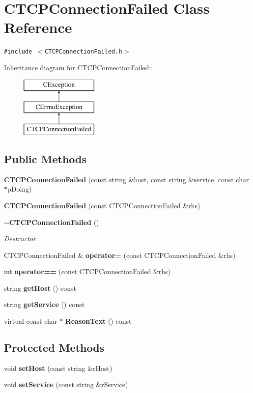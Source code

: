 \section{CTCPConnection\-Failed  Class Reference}
\label{classCTCPConnectionFailed}
{\tt \#include $<$CTCPConnection\-Failed.h$>$}

Inheritance diagram for CTCPConnection\-Failed::\begin{figure}[H]
\begin{center}
\leavevmode
\includegraphics[height=3cm]{classCTCPConnectionFailed}
\end{center}
\end{figure}
\subsection*{Public Methods}
\begin{CompactItemize}
\item 
{\bf CTCPConnection\-Failed} (const string \&host, const string \&service, const char $\ast$p\-Doing)
\item 
{\bf CTCPConnection\-Failed} (const CTCPConnection\-Failed \&rhs)
\item 
{\bf $\sim$CTCPConnection\-Failed} ()
\begin{CompactList}\small\item\em Destructor.\item\end{CompactList}\item 
CTCPConnection\-Failed \& {\bf operator=} (const CTCPConnection\-Failed \&rhs)
\item 
int {\bf operator==} (const CTCPConnection\-Failed \&rhs)
\item 
string {\bf get\-Host} () const
\item 
string {\bf get\-Service} () const
\item 
virtual const char $\ast$ {\bf Reason\-Text} () const
\end{CompactItemize}
\subsection*{Protected Methods}
\begin{CompactItemize}
\item 
void {\bf set\-Host} (const string \&r\-Host)
\item 
void {\bf set\-Service} (const string \&r\-Service)
\end{CompactItemize}
